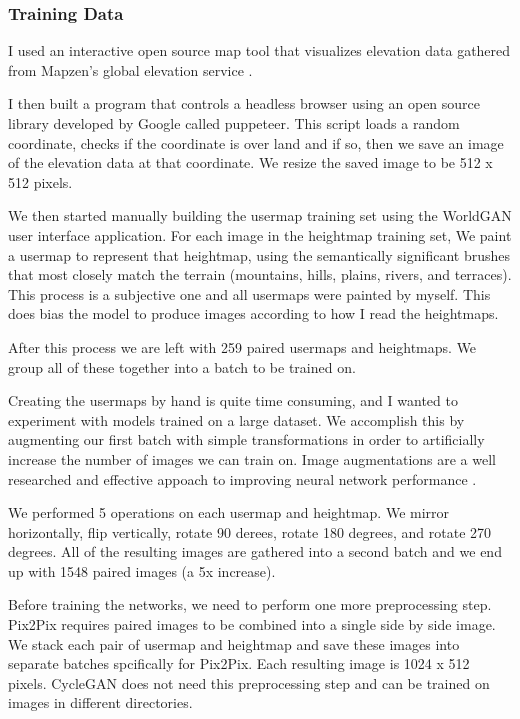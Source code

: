 \documentclass[twocolumn]{article}
\begin{document}
	\subsubsection{Training Data}
	
	I used an interactive open source map tool that visualizes elevation data gathered from Mapzen's global elevation service \cite{richardson2016mapzen}.
	
	I then built a program that controls a headless browser using an open source library developed by Google called puppeteer. This script loads a random coordinate, checks if the coordinate is over land and if so, then we save an image of the elevation data at that coordinate. We resize the saved image to be 512 x 512 pixels.
	
	We then started manually building the usermap training set using the WorldGAN user interface application. For each image in the heightmap training set, We paint a usermap to represent that heightmap, using the semantically significant brushes that most closely match the terrain (mountains, hills, plains, rivers, and terraces). This process is a subjective one and all usermaps were painted by myself. This does bias the model to produce images according to how I read the heightmaps.

	After this process we are left with 259 paired usermaps and heightmaps. We group all of these together into a batch to be trained on.

	Creating the usermaps by hand is quite time consuming, and I wanted to experiment with models trained on a large dataset. We accomplish this by augmenting our first batch with simple transformations in order to artificially increase the number of images we can train on. Image augmentations are a well researched and effective appoach to improving neural network performance \cite{perez2017effectiveness}.
	
	We performed 5 operations on each usermap and heightmap. We mirror horizontally, flip vertically, rotate 90 derees, rotate 180 degrees, and rotate 270 degrees.	All of the resulting images are gathered into a second batch and we end up with 1548 paired images (a 5x increase).
	
	Before training the networks, we need to perform one more preprocessing step. Pix2Pix requires paired images to be combined into a single side by side image. We stack each pair of usermap and heightmap and save these images into separate batches spcifically for Pix2Pix. Each resulting image is 1024 x 512 pixels. CycleGAN does not need this preprocessing step and can be trained on images in different directories.
			
\end{document}
